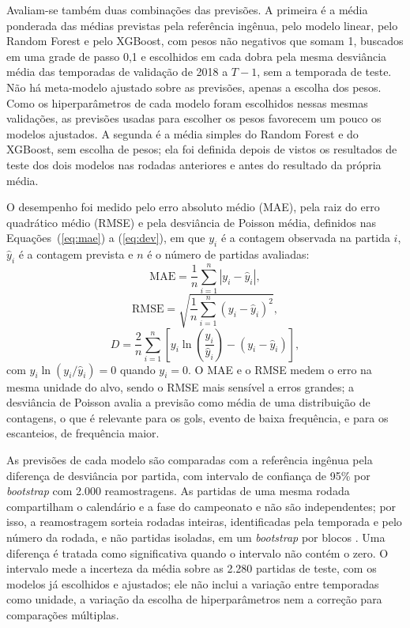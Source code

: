 Avaliam-se também duas combinações das previsões. A primeira é a média ponderada das médias previstas pela referência ingênua, pelo modelo linear, pelo Random Forest e pelo XGBoost, com pesos não negativos que somam 1, buscados em uma grade de passo 0,1 e escolhidos em cada dobra pela mesma desviância média das temporadas de validação de 2018 a $T-1$, sem a temporada de teste. Não há meta-modelo ajustado sobre as previsões, apenas a escolha dos pesos. Como os hiperparâmetros de cada modelo foram escolhidos nessas mesmas validações, as previsões usadas para escolher os pesos favorecem um pouco os modelos ajustados. A segunda é a média simples do Random Forest e do XGBoost, sem escolha de pesos; ela foi definida depois de vistos os resultados de teste dos dois modelos nas rodadas anteriores e antes do resultado da própria média.

O desempenho foi medido pelo erro absoluto médio (MAE), pela raiz do erro quadrático médio (RMSE) e pela desviância de Poisson média, definidos nas Equações~(\ref{eq:mae}) a (\ref{eq:dev}), em que $y_i$ é a contagem observada na partida $i$, $\hat{y}_i$ é a contagem prevista e $n$ é o número de partidas avaliadas:
\begin{equation}\label{eq:mae}
  \mathrm{MAE} = \frac{1}{n}\sum_{i=1}^{n} \left| y_i - \hat{y}_i \right|,
\end{equation}
\begin{equation}\label{eq:rmse}
  \mathrm{RMSE} = \sqrt{\frac{1}{n}\sum_{i=1}^{n} (y_i - \hat{y}_i)^2},
\end{equation}
\begin{equation}\label{eq:dev}
  D = \frac{2}{n}\sum_{i=1}^{n} \left[ y_i \ln\!\left(\frac{y_i}{\hat{y}_i}\right) - (y_i - \hat{y}_i) \right],
\end{equation}
com $y_i \ln(y_i/\hat{y}_i) = 0$ quando $y_i = 0$. O MAE e o RMSE medem o erro na mesma unidade do alvo, sendo o RMSE mais sensível a erros grandes; a desviância de Poisson avalia a previsão como média de uma distribuição de contagens, o que é relevante para os gols, evento de baixa frequência, e para os escanteios, de frequência maior.

As previsões de cada modelo são comparadas com a referência ingênua pela diferença de desviância por partida, com intervalo de confiança de 95\% por \textit{bootstrap} com 2.000 reamostragens. As partidas de uma mesma rodada compartilham o calendário e a fase do campeonato e não são independentes; por isso, a reamostragem sorteia rodadas inteiras, identificadas pela temporada e pelo número da rodada, e não partidas isoladas, em um \textit{bootstrap} por blocos \cite{kunsch1989}. Uma diferença é tratada como significativa quando o intervalo não contém o zero. O intervalo mede a incerteza da média sobre as 2.280 partidas de teste, com os modelos já escolhidos e ajustados; ele não inclui a variação entre temporadas como unidade, a variação da escolha de hiperparâmetros nem a correção para comparações múltiplas.

